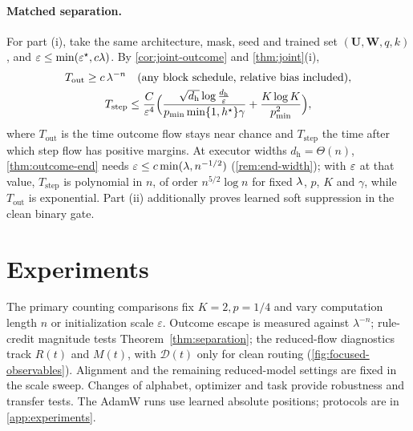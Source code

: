 \paragraph{Matched separation.} For part (i), take the same architecture, mask, seed and trained set $(\mathbf U,\mathbf W,q,k)$, and $\varepsilon\le\min(\varepsilon^\star,c\lambda)$.
By \cref{cor:joint-outcome} and \cref{thm:joint}(i),
\begin{gather*}
 T_{\mathrm{out}}\ge c\,\lambda^{-n}\quad\text{(any block schedule, relative bias included)},\\
 T_{\mathrm{step}}\le\frac{C}{\varepsilon^4}\Bigl(\frac{\sqrt{d_{\mathrm h}}\log\frac{d_{\mathrm h}}{\varepsilon}}{p_{\min}\min\{1,h^\star\}\gamma}+\frac{K\log K}{p_{\min}^2}\Bigr),
\end{gather*}
where $T_{\mathrm{out}}$ is the time outcome flow stays near chance and $T_{\mathrm{step}}$ the time after which step flow has positive margins. At executor
widths $d_{\mathrm h}=\Theta(n)$, \cref{thm:outcome-end} needs $\varepsilon\le c\min(\lambda,n^{-1/2})$ (\cref{rem:end-width}); with $\varepsilon$ at that value, $T_{\mathrm{step}}$ is polynomial
in $n$, of order $n^{5/2}\log n$ for fixed $\lambda$, $p$, $K$ and $\gamma$, while $T_{\mathrm{out}}$ is exponential. Part (ii) additionally proves learned soft suppression in the clean binary gate.

\suppressfloats[t]
\section{Experiments}
\label{sec:experiments}
\label{sec:validation}

The primary counting comparisons fix $K=2,p=1/4$ and vary computation length
$n$ or initialization scale $\varepsilon$. Outcome escape is measured against
$\lambda^{-n}$; rule-credit magnitude tests Theorem~\ref{thm:separation};
the reduced-flow diagnostics track $R(t)$ and $M(t)$, with $\mathcal D(t)$
only for clean routing (\cref{fig:focused-observables}). Alignment and the remaining
reduced-model settings are fixed in the scale sweep. Changes of alphabet,
optimizer and task provide robustness and transfer tests. The AdamW runs use
learned absolute positions; protocols are in \cref{app:experiments}.

